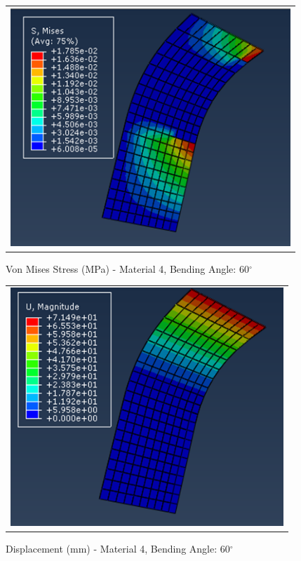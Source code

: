 \documentclass[a4paper,12pt]{article}
\numberwithin{equation}{section}
\numberwithin{figure}{section}
\begin{document}
\begin{figure}[H]
  \centering
  \begin{tabular}{@{}c@{}}
    \includegraphics[width=0.7\linewidth,height=255pt]{Results/Bending/M4_VMS_60.png} \\
  \end{tabular}
  \caption{Von Mises Stress (MPa) - Material 4,  Bending Angle: 60$^{\circ}$ }
\end{figure}

\begin{figure}[H]
  \centering
  \begin{tabular}{@{}c@{}}
    \includegraphics[width=0.7\linewidth,height=255pt]{Results/Bending/M4_DIS_60.png} \\
  \end{tabular}
  \caption{Displacement (mm) - Material 4, Bending Angle: 60$^{\circ}$ }
\end{figure}
\end{document}

